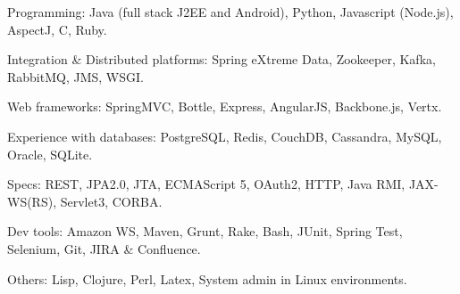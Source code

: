 \begin{rlist}
  \item Programming: Java (full stack J2EE and Android), Python, Javascript (Node.js),
  AspectJ, C, Ruby.
  \item Integration \& Distributed platforms: Spring eXtreme Data, Zookeeper, Kafka, RabbitMQ, JMS, WSGI.
  \item Web frameworks: SpringMVC, Bottle, Express, AngularJS, Backbone.js, Vertx.
  \item Experience with databases: PostgreSQL, Redis, CouchDB, Cassandra, MySQL, Oracle, SQLite.
  \item Specs: REST, JPA2.0, JTA, ECMAScript 5, OAuth2, HTTP,
  Java RMI, JAX-WS(RS), Servlet3, CORBA.
  \item Dev tools: Amazon WS, Maven, Grunt, Rake, Bash, JUnit, Spring Test,
  Selenium, Git, JIRA \& Confluence.
  \item Others: Lisp, Clojure, Perl, Latex, System admin in Linux
  environments.
\end{rlist}

